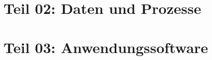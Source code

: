 \documentclass{article}
\begin{document}
	\newpage
	\setcounter{section}{0}
	\section*{Teil 02: Daten und Prozesse}
	\begin{adjustwidth}{2em}{2em}
	\end{adjustwidth}
	
	\newpage
	\setcounter{section}{0}
	\section*{Teil 03: Anwendungssoftware}
	\begin{adjustwidth}{2em}{2em}
	\end{adjustwidth}
	
\end{document}
